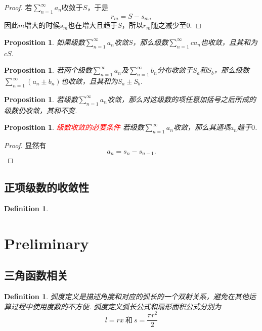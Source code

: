\documentclass{article}
\newtheorem{proposition}[theorem]{Proposition}
\newtheorem{definition}[theorem]{Definition}
\newcommand{\redt}[1]{\textcolor{red}{#1}}
\begin{document}
\begin{proof}
若$\sum\limits_{n=1}^\infty a_n$收敛于$S$，于是
$$
r_m = S - s_m,
$$
因此$m$增大的时候$s_m$也在增大且趋于$S$，所以$r_m$随之减少至$0$.
\end{proof}

\begin{proposition}
\rm 如果级数$\sum\limits_{n=1}^\infty a_n$收敛$S$，那么级数$\sum\limits_{n=1}^\infty ca_n$也收敛，且其和为$cS$. 
\end{proposition}


\begin{proposition}
\rm 若两个级数$\sum\limits_{n=1}^\infty a_n$及$\sum\limits_{n=1}^\infty b_n$分布收敛于$S_a$和$S_b$，那么级数$\sum\limits_{n=1}^\infty (a_n \pm b_n)$也收敛，且其和为$S_a \pm S_b$.
\end{proposition}

\begin{proposition}
\rm 若级数$\sum\limits_{n=1}^\infty a_n$收敛，那么对这级数的项任意加括号之后所成的级数仍收敛，其和不变.
\end{proposition}

\begin{proposition}
\rm \redt{级数收敛的必要条件} 若级数$\sum\limits_{n=1}^\infty a_n$收敛，那么其通项$a_n$趋于$0$. 
\end{proposition}

\begin{proof}
显然有
$$
a_n = s_n - s_{n-1}.
$$
\end{proof}

\subsection{正项级数的收敛性}

\begin{definition}
\rm 
\end{definition}

\newpage
\section{Preliminary}

\subsection{三角函数相关}
\begin{definition}
\rm 弧度定义是{\color{red}描述角度和对应的弧长的一个双射关系}，避免在其他运算过程中使用度数的不方便. 弧度定义{\color{red}弧长公式}和{\color{red}扇形面积公式}分别为
$$
l = rx ~\text{和}~ s = \frac{\pi r^2}{2}
$$
\end{definition}
\end{document}
